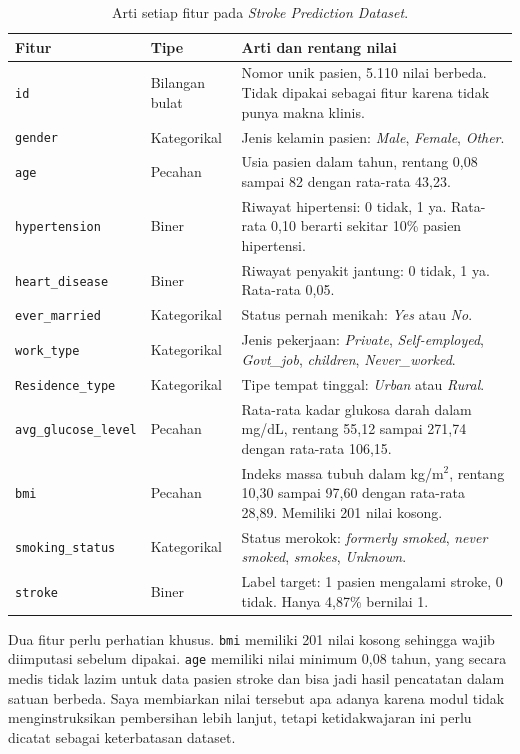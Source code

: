 \documentclass[a4paper,oneside,12pt]{report}
\begin{document}
\begin{table}[H]
\centering
\caption{Arti setiap fitur pada \textit{Stroke Prediction Dataset}.}
\label{tab:fitur-stroke}
\small
\begin{tabularx}{\linewidth}{|l|>{\raggedright\arraybackslash}p{2.6cm}|>{\raggedright\arraybackslash}X|}
\hline
\textbf{Fitur} & \textbf{Tipe} & \textbf{Arti dan rentang nilai} \\
\hline
\texttt{id} & Bilangan bulat & Nomor unik pasien, 5.110 nilai berbeda. Tidak dipakai sebagai fitur karena tidak punya makna klinis. \\
\hline
\texttt{gender} & Kategorikal & Jenis kelamin pasien: \textit{Male}, \textit{Female}, \textit{Other}. \\
\hline
\texttt{age} & Pecahan & Usia pasien dalam tahun, rentang 0,08 sampai 82 dengan rata-rata 43,23. \\
\hline
\texttt{hypertension} & Biner & Riwayat hipertensi: 0 tidak, 1 ya. Rata-rata 0,10 berarti sekitar 10\% pasien hipertensi. \\
\hline
\texttt{heart\_disease} & Biner & Riwayat penyakit jantung: 0 tidak, 1 ya. Rata-rata 0,05. \\
\hline
\texttt{ever\_married} & Kategorikal & Status pernah menikah: \textit{Yes} atau \textit{No}. \\
\hline
\texttt{work\_type} & Kategorikal & Jenis pekerjaan: \textit{Private}, \textit{Self-employed}, \textit{Govt\_job}, \textit{children}, \textit{Never\_worked}. \\
\hline
\texttt{Residence\_type} & Kategorikal & Tipe tempat tinggal: \textit{Urban} atau \textit{Rural}. \\
\hline
\texttt{avg\_glucose\_level} & Pecahan & Rata-rata kadar glukosa darah dalam mg/dL, rentang 55,12 sampai 271,74 dengan rata-rata 106,15. \\
\hline
\texttt{bmi} & Pecahan & Indeks massa tubuh dalam kg/m$^2$, rentang 10,30 sampai 97,60 dengan rata-rata 28,89. Memiliki 201 nilai kosong. \\
\hline
\texttt{smoking\_status} & Kategorikal & Status merokok: \textit{formerly smoked}, \textit{never smoked}, \textit{smokes}, \textit{Unknown}. \\
\hline
\texttt{stroke} & Biner & Label target: 1 pasien mengalami stroke, 0 tidak. Hanya 4,87\% bernilai 1. \\
\hline
\end{tabularx}
\end{table}

Dua fitur perlu perhatian khusus. \texttt{bmi} memiliki 201 nilai kosong sehingga wajib diimputasi sebelum dipakai. \texttt{age} memiliki nilai minimum 0,08 tahun, yang secara medis tidak lazim untuk data pasien stroke dan bisa jadi hasil pencatatan dalam satuan berbeda. Saya membiarkan nilai tersebut apa adanya karena modul tidak menginstruksikan pembersihan lebih lanjut, tetapi ketidakwajaran ini perlu dicatat sebagai keterbatasan dataset.
\end{document}
